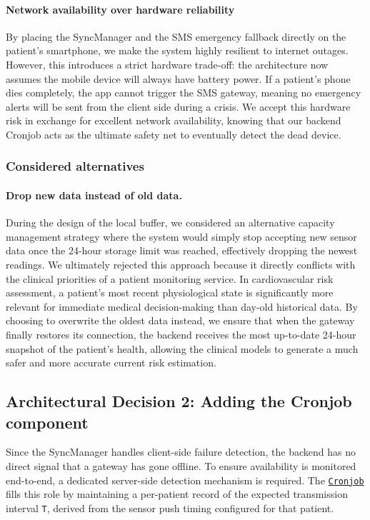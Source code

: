 \paragraph{Network availability over hardware reliability}
By placing the SyncManager and the SMS emergency fallback directly on the patient's smartphone, we make the system highly resilient to internet outages. However, this introduces a strict hardware trade-off: the architecture now assumes the mobile device will always have battery power. If a patient's phone dies completely, the app cannot trigger the SMS gateway, meaning no emergency alerts will be sent from the client side during a crisis. We accept this hardware risk in exchange for excellent network availability, knowing that our backend Cronjob acts as the ultimate safety net to eventually detect the dead device.


\subsubsection*{Considered alternatives}
\paragraph{Drop new data instead of old data.}
During the design of the local buffer, we considered an alternative capacity management strategy where the system would simply stop accepting new sensor data once the 24-hour storage limit was reached, effectively dropping the newest readings. We ultimately rejected this approach because it directly conflicts with the clinical priorities of a patient monitoring service. In cardiovascular risk assessment, a patient's most recent physiological state is significantly more relevant for immediate medical decision-making than day-old historical data. By choosing to overwrite the oldest data instead, we ensure that when the gateway finally restores its connection, the backend receives the most up-to-date 24-hour snapshot of the patient's health, allowing the clinical models to generate a much safer and more accurate current risk estimation.


\subsection*{Architectural Decision 2: Adding the Cronjob component}

Since the SyncManager handles client-side failure detection, the backend has no direct signal that a gateway has gone offline. To ensure availability is monitored end-to-end, a dedicated server-side detection mechanism is required. The \hyperref[diag:Component:Primarydiagramoftheclientserverview]{\texttt{Cronjob}} fills this role by maintaining a per-patient record of the expected transmission interval \texttt{T}, derived from the sensor push timing configured for that patient.

